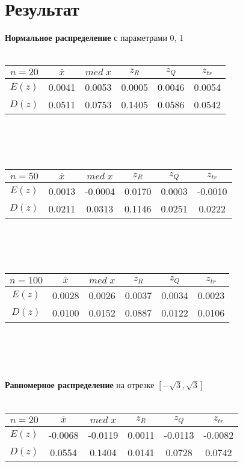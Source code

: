 \documentclass[12pt]{article}
\begin{document}

\newpage
\section*{Результат}

\textbf{Нормальное распределение} с параметрами 0, 1\\
\\
\begin{tabular}{ | c | c | c | c | c | c |}
\hline
$n = 20$ & $\overline{x}$ & $med\;x$ & $z_R$ & $z_Q$ & $z_{tr}$ \\ \hline
$E(z)$ & 0.0041 & 0.0053 & 0.0005 & 0.0046 & 0.0054 \\ \hline
$D(z)$ & 0.0511 & 0.0753 & 0.1405 & 0.0586 & 0.0542 \\ \hline
\end{tabular}
\\
\\ \\
\begin{tabular}{ | c | c | c | c | c | c |}
\hline
$n = 50$ & $\overline{x}$ & $med\;x$ & $z_R$ & $z_Q$ & $z_{tr}$ \\ \hline
$E(z)$ & 0.0013 & -0.0004 & 0.0170 & 0.0003 & -0.0010 \\ \hline
$D(z)$ & 0.0211 & 0.0313 & 0.1146 & 0.0251 & 0.0222 \\ \hline
\end{tabular}
\\ 
\\ \\
\begin{tabular}{ | c | c | c | c | c | c |}
\hline
$n = 100$ & $\overline{x}$ & $med\;x$ & $z_R$ & $z_Q$ & $z_{tr}$ \\ \hline
$E(z)$ & 0.0028 & 0.0026 & 0.0037 & 0.0034 & 0.0023 \\ \hline
$D(z)$ & 0.0100 & 0.0152 & 0.0887 & 0.0122 & 0.0106 \\ \hline
\end{tabular}
\\ \\
\\ \\
\textbf{Равномерное распределение} на отрезке $[-\sqrt{3}, \sqrt{3}]$
\\  \\
\begin{tabular}{ | c | c | c | c | c | c |}
\hline
$n = 20$ & $\overline{x}$ & $med\;x$ & $z_R$ & $z_Q$ & $z_{tr}$ \\ \hline
$E(z)$ & -0.0068 & -0.0119 & 0.0011 & -0.0113 & -0.0082 \\ \hline
$D(z)$ & 0.0554 & 0.1404 & 0.0141 & 0.0728 & 0.0742 \\ \hline
\end{tabular}
\end{document}
